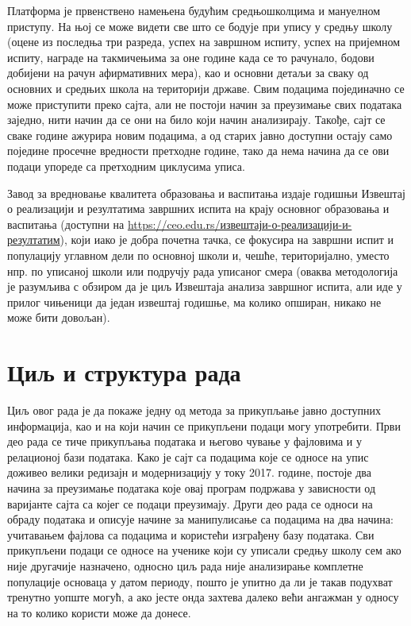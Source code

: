 Платформа је првенствено намењена будућим средњошколцима и мануелном приступу. На њој се може видети све што се бодује при упису у средњу школу (оцене из последња три разреда, успех на завршном испиту, успех на пријемном испиту, награде на такмичењима за оне године када се то рачунало, бодови добијени на рачун афирмативних мера), као и основни детаљи за сваку од основних и средњих школа на територији државе. Свим подацима појединачно се може приступити преко сајта, али не постоји начин за преузимање свих података заједно, нити начин да се они на било који начин анализирају. Такође, сајт се сваке године ажурира новим подацима, а од старих јавно доступни остају само поједине просечне вредности претходне године, тако да нема начина да се ови подаци упореде са претходним циклусима уписа.

Завод за вредновање квалитета образовања и васпитања издаје годишњи Извештај о реализацији и резултатима завршних испита на крају основног образовања и васпитања (доступни на \href{https://ceo.edu.rs/\%D0\%B8\%D0\%B7\%D0\%B2\%D0\%B5\%D1\%88\%D1\%82\%D0\%B0\%D1\%98\%D0\%B8-\%D0\%BE-\%D1\%80\%D0\%B5\%D0\%B0\%D0\%BB\%D0\%B8\%D0\%B7\%D0\%B0\%D1\%86\%D0\%B8\%D1\%98\%D0\%B8-\%D0\%B8-\%D1\%80\%D0\%B5\%D0\%B7\%D1\%83\%D0\%BB\%D1\%82\%D0\%B0\%D1\%82\%D0\%B8\%D0\%BC/}{https://ceo.edu.rs/извештаји-о-реализацији-и-резултатим}), који иако је добра почетна тачка, се фокусира на завршни испит и популацију углавном дели по основној школи и, чешће, територијално, уместо нпр. по уписаној школи или подручју рада уписаног смера (оваква методологија је разумљива с обзиром да је циљ Извештаја анализа завршног испита, али иде у прилог чињеници да један извештај годишње, ма колико опширан, никако не може бити довољан).

\section{Циљ и структура рада}

Циљ овог рада је да покаже једну од метода за прикупљање јавно доступних информација, као и на који начин се прикупљени подаци могу употребити. Први део рада се тиче прикупљања података и његово чување у фајловима и у релационој бази података. Како је сајт са подацима које се односе на упис доживео велики редизајн и модернизацију у току 2017. године, постоје два начина за преузимање података које овај програм подржава у зависности од варијанте сајта са којег се подаци преузимају. Други део рада се односи на обраду података и описује начине за манипулисање са подацима на два начина: учитавањем фајлова са подацима и користећи изграђену базу података. Сви прикупљени подаци се односе на ученике који су уписали средњу школу сем ако није другачије назначено, односно циљ рада није анализирање комплетне популације основаца у датом периоду, пошто је упитно да ли је такав подухват тренутно уопште могућ, а ако јесте онда захтева далеко већи ангажман у односу на то колико користи може да донесе.